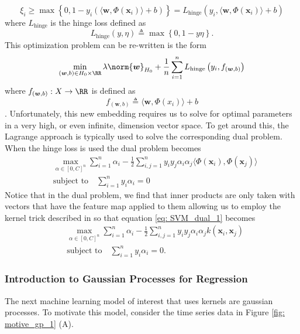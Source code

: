 \[
    \xi_i \geq \max \left\{ 0, 1 - y_i \left( \langle \bm{w} , \Phi \left( \bm{x}_i \right) \rangle + b \right)  \right\} = L_{\text{hinge}} \left( y_i , \langle \bm{w} , \Phi \left( \bm{x}_i \right) \rangle + b \right)
\]
where $L_{\text{hinge}}$ is the hinge loss defined as
\[
    L_{\text{hinge}} \left( y,\eta \right) \triangleq \max \left\{ 0,1-y\eta \right\}.
\]
This optimization problem can be re-written is the form
\[
    \min_{\left( \bm{w} , b \right) \in H_0 \times \RR} \lambda \norm{\bm{w}}_{H_0} + \frac{1}{n} \sum_{i=1}^{n} L_{\text{hinge}} \left( y_i , f_{\left( \bm{w} , b \right)} \right)
\]
where $f_{\left( \bm{w} , b \right)} : X \to \RR$ is defined as
\[
    f_{\left( \bm{w} , b \right)} \triangleq \langle \bm{w} , \Phi \left( x_i \right) \rangle + b
\]
\cite{SteinwartIngo2008SVMb}. Unfortunately, this new embedding requires us to solve for optimal parameters in a very high, or even infinite, dimension vector space. To get around this, the Lagrange approach is typically used to solve the corresponding dual problem. When the hinge loss is used the dual problem becomes
\begin{align} \label{eq: SVM_dual_1}
     & \max_{\alpha \in \left[ 0,C \right]^n} \sum_{i=1}^{n} \alpha_i - \frac{1}{2} \sum_{i,j=1}^{n} y_i y_j \alpha_i \alpha_j \langle \Phi \left( \bm{x}_i \right), \Phi \left( \bm{x}_j \right) \rangle \nonumber \\
     & \text{subject to} \quad \sum_{i=1}^{n} y_i \alpha_i = 0
\end{align}
Notice that in the dual problem, we find that inner products are only taken with vectors that have the feature map applied to them allowing us to employ the kernel trick described in  so that equation \ref{eq: SVM_dual_1} becomes
\begin{align*}
     & \max_{\alpha \in \left[ 0,C \right]^n} \sum_{i=1}^{n} \alpha_i - \frac{1}{2} \sum_{i,j=1}^{n} y_i y_j \alpha_i \alpha_j k \left( \bm{x}_i, \bm{x}_j \right) \\
     & \text{subject to} \quad \sum_{i=1}^{n} y_i \alpha_i = 0.
\end{align*}

\subsubsection{Introduction to Gaussian Processes for Regression}\label{Section1.4.2}
The next machine learning model of interest that uses kernels are gaussian processes. To motivate this model, consider the time series data in Figure \ref{fig: motive_gp_1} (A).


